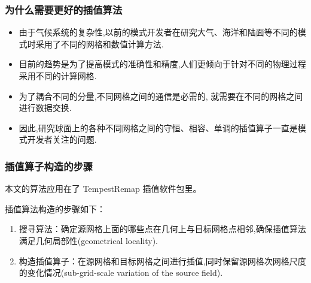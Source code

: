 \documentclass[unknownkeysallowed]{beamer}
\begin{document}
\begin{spacing}{1.2}
\begin{frame}
\frametitle{为什么需要更好的插值算法}

\begin{itemize}
\item 由于气候系统的复杂性,以前的模式开发者在研究大气、海洋和陆面等不同的模式时采用了不同的网格和数值计算方法.\\%
\pause
\item 目前的趋势是为了提高模式的准确性和精度,人们更倾向于针对不同的物理过程采用不同的计算网格.%
\pause
\item 为了耦合不同的分量,不同网格之间的通信是必需的, 就需要在不同的网格之间进行数据交换.%
\pause
\item 因此,研究球面上的各种不同网格之间的守恒、相容、单调的插值算子一直是模式开发者关注的问题.\\
\end{itemize}
\end{frame}

\begin{frame}
\frametitle{插值算子构造的步骤}
本文的算法应用在了 TempestRemap 插值软件包里。\par
\pause
插值算法构造的步骤如下：
\begin{enumerate}
\pause
\item \textcolor[rgb]{0,0,1}{搜寻算法}：确定源网格上面的哪些点在几何上与目标网格点相邻,确保插值算法满足几何局部性(geometrical locality).\\
\normalsize
\pause
\item \textcolor[rgb]{0,0,1}{构造插值算子}：在源网格和目标网格之间进行插值,同时保留源网格次网格尺度的变化情况(sub-grid-scale variation of the source field).\\
\end{enumerate}
\end{frame}


\end{spacing}
\end{document}
